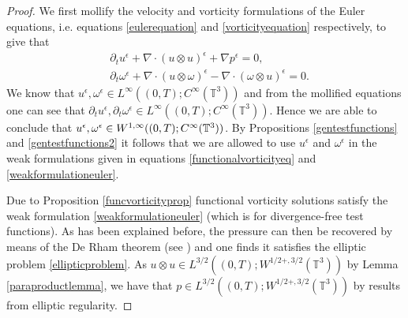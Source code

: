 \documentclass[12pt,a4paper]{article}
\theoremstyle{definition}
\theoremstyle{remark}
\numberwithin{equation}{section}
\begin{document}
\begin{proof}
We first mollify the velocity and vorticity formulations of the Euler equations, i.e. equations \eqref{eulerequation} and \eqref{vorticityequation} respectively, to give that
\begin{align}
&\partial_t u^\epsilon + \nabla \cdot ( u \otimes u)^\epsilon + \nabla p^\epsilon = 0, \label{mollifiedeuler1} \\
&\partial_t \omega^\epsilon + \nabla \cdot (u \otimes \omega)^\epsilon - \nabla \cdot (\omega \otimes u)^\epsilon = 0. \label{mollifiedeuler2}
\end{align}
We know that $u^\epsilon, \omega^\epsilon \in L^\infty ((0,T); C^\infty (\mathbb{T}^3))$ and from the mollified equations one can see that $\partial_t u^\epsilon, \partial_t \omega^\epsilon \in L^\infty ((0,T); C^\infty (\mathbb{T}^3))$. Hence we are able to conclude that $u^\epsilon, \omega^\epsilon \in W^{1,\infty} ((0,T); \linebreak C^\infty (\mathbb{T}^3))$. By Propositions \ref{gentestfunctions} and \ref{gentestfunctions2} it follows that we are allowed to use $u^\epsilon$ and $\omega^\epsilon$ in the weak formulations given in equations \eqref{functionalvorticityeq} and \eqref{weakformulationeuler}.

Due to Proposition \ref{funcvorticityprop} functional vorticity solutions satisfy the weak formulation \eqref{weakformulationeuler} (which is for divergence-free test functions). As has been explained before, the pressure can then be recovered by means of the De Rham theorem (see \cite[~Chapter 1, Proposition 1.1]{temambook}) and one finds it satisfies the elliptic problem \eqref{ellipticproblem}. As $u \otimes u \in L^{3/2} ((0,T); W^{1/2+,3/2} (\mathbb{T}^3))$ by Lemma \ref{paraproductlemma}, we have that $p \in L^{3/2} ((0,T); W^{1/2+,3/2} (\mathbb{T}^3))$ by results from elliptic regularity. 



\end{proof}
\end{document}
